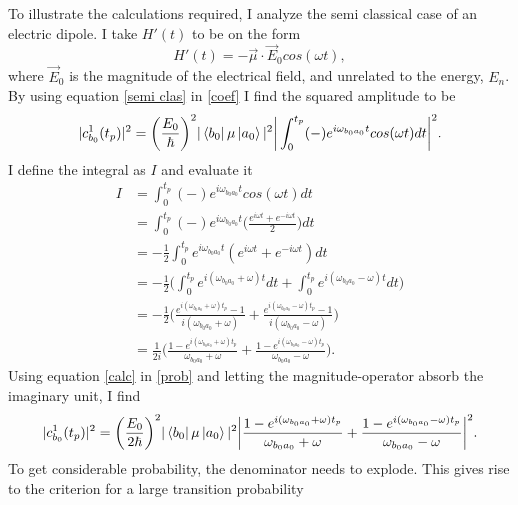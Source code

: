 \begin{example}
	\label{electric dipole}
	To illustrate the calculations required, I analyze the semi classical case of an electric dipole. I take $H'(t)$ to be on the form
	\begin{equation}
		H'(t)=-\vec{\mu}\cdot\vec{E}_0cos(\omega t),
		\label{semi clas}
	\end{equation} 
	where $\vec{E}_0$ is the magnitude of the electrical field, and unrelated to the energy, $E_n$. By using equation \eqref{semi clas} in \eqref{coef} I find the squared amplitude to be
	\begin{equation}
		|c^1_{b_0}(t_p)|^2=\bigg(\frac{E_0}{\hbar}\bigg)^2|\bra{b_0}\mu\ket{a_0}|^2\bigg|\int_{0}^{t_p}(-)e^{i\omega_{b_0a_0}t}cos(\omega t)dt\bigg|^2.
		\label{prob}
	\end{equation} 
	I define the integral as $I$ and evaluate it
	\begin{equation}
		\begin{split}
			I
			&=\int_{0}^{t_p}(-)e^{i\omega_{b_0a_0}t}cos(\omega t)dt\\
			&=\int_{0}^{t_p}(-)e^{i\omega_{b_0a_0}t}\bigg(\frac{e^{i\omega t}+e^{-i\omega t}}{2}\bigg)dt\\
			&=-\frac{1}{2}\int_{0}^{t_p}e^{i\omega_{b_0a_0}t}(e^{i\omega t}+e^{-i\omega t})dt\\
			&=-\frac{1}{2}\bigg(\int_{0}^{t_p}e^{i(\omega_{b_0a_0}+\omega)t}dt+\int_{0}^{t_p}e^{i(\omega_{b_0a_0}-\omega)t}dt\bigg)\\
			&=-\frac{1}{2}\bigg(\frac{e^{i(\omega_{b_0a_0}+\omega)t_p}-1}{i(\omega_{b_0a_0}+\omega)}+\frac{e^{i(\omega_{b_0a_0}-\omega)t_p}-1}{i(\omega_{b_0a_0}-\omega)}\bigg)\\
			&=\frac{1}{2i}\bigg(\frac{1-e^{i(\omega_{b_0a_0}+\omega)t_p}}{\omega_{b_0a_0}+\omega}+\frac{1-e^{i(\omega_{b_0a_0}-\omega)t_p}}{\omega_{b_0a_0}-\omega}\bigg).
		\end{split}
		\label{calc}
	\end{equation} 
	Using equation \eqref{calc} in \ref{prob} and letting the magnitude-operator absorb the imaginary unit, I find
	\begin{equation}
		|c^1_{b_0}(t_p)|^2=\bigg(\frac{E_0}{2\hbar}\bigg)^2|\bra{b_0}\mu\ket{a_0}|^2\bigg|\frac{1-e^{i(\omega_{b_0a_0}+\omega)t_p}}{\omega_{b_0a_0}+\omega}+\frac{1-e^{i(\omega_{b_0a_0}-\omega)t_p}}{\omega_{b_0a_0}-\omega}\bigg|^2.
	\end{equation} 
	To get considerable probability, the denominator needs to explode. This gives rise to the criterion for a large transition probability

\end{example}

